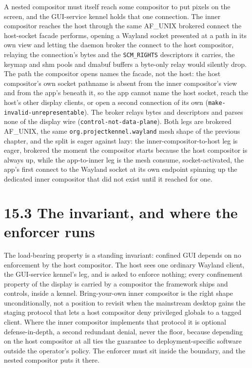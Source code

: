 A nested compositor must itself reach some compositor to put pixels on
the screen, and the GUI-service kennel holds that one connection. The
inner compositor reaches the host through the same AF\_UNIX brokered
connect the host-socket facade performs, opening a Wayland socket
presented at a path in its own view and letting the daemon broker the
connect to the host compositor, relaying the connection's bytes and the
\texttt{SCM\_RIGHTS} descriptors it carries, the keymap and shm pools
and dmabuf buffers a byte-only relay would silently drop. The path the
compositor opens names the facade, not the host: the host compositor's
own socket pathname is absent from the inner compositor's view and from
the app's beneath it, so the app cannot name the host socket, reach the
host's other display clients, or open a second connection of its own
(\texttt{make-invalid-unrepresentable}). The broker relays bytes and
descriptors and parses none of the display wire
(\texttt{control-not-data-plane}). Both legs are brokered AF\_UNIX, the
same \texttt{org.projectkennel.wayland} mesh shape of the previous
chapter, and the split is eager against lazy: the
inner-compositor-to-host leg is eager, brokered the moment the
compositor starts because the host compositor is always up, while the
app-to-inner leg is the mesh consume, socket-activated, the app's first
connect to the Wayland socket at its own endpoint spinning up the
dedicated inner compositor that did not exist until it reached for one.

\hypertarget{the-invariant-and-where-the-enforcer-runs}{%
\section{15.3 The invariant, and where the enforcer
runs}\label{the-invariant-and-where-the-enforcer-runs}}

The load-bearing property is a standing invariant: confined GUI depends
on no enforcement by the host compositor. The host sees one ordinary
Wayland client, the GUI-service kennel's leg, and is asked to enforce
nothing; every confinement property of the display is carried by a
compositor the framework ships and controls, inside a kennel.
Bring-your-own inner compositor is the right shape unconditionally, not
a position to revisit when the mainstream desktop gains the staging
protocol that lets a host compositor deny privileged globals to a tagged
client. Where the inner compositor implements that protocol it is
optional defense-in-depth, a second redundant denial, never the floor,
because depending on the host compositor at all ties the guarantee to
deployment-specific software outside the operator's policy. The enforcer
must sit inside the boundary, and the nested compositor puts it there.

